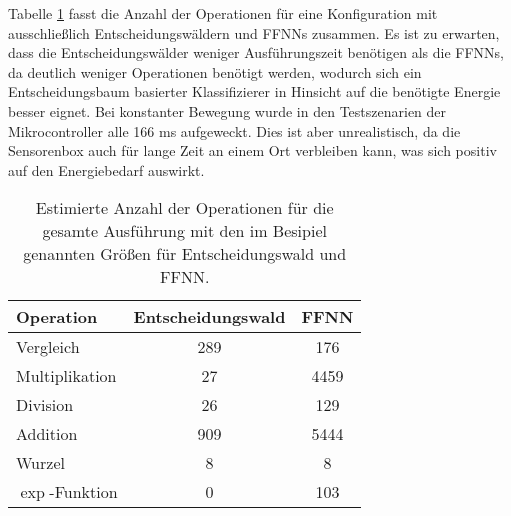 \newline
\newline
Tabelle \ref{tab:complexity_summary} fasst die Anzahl der Operationen für eine Konfiguration mit ausschließlich Entscheidungswäldern und FFNNs zusammen.
Es ist zu erwarten, dass die Entscheidungswälder weniger Ausführungszeit benötigen als die FFNNs, da deutlich weniger Operationen benötigt werden,
wodurch sich ein Entscheidungsbaum basierter Klassifizierer in Hinsicht auf die benötigte Energie besser eignet.
Bei konstanter Bewegung wurde in den Testszenarien der Mikrocontroller alle 166 ms aufgeweckt.
Dies ist aber unrealistisch, da die Sensorenbox auch für lange Zeit an einem Ort verbleiben kann, was sich positiv auf den Energiebedarf auswirkt.
\begin{table}[h!]
    \centering
    \begin{tabular}{ | l | c | c | }
        \hline
        Operation & Entscheidungswald & FFNN \\\hline
        Vergleich & 289 & 176 \\\hline
        Multiplikation & 27 & 4459 \\\hline
        Division & 26 & 129 \\\hline
        Addition & 909 & 5444 \\\hline
        Wurzel & 8 & 8 \\\hline
        $\exp$-Funktion & 0 & 103 \\\hline
    \end{tabular}
    \caption{Estimierte Anzahl der Operationen für die gesamte Ausführung mit den im Besipiel genannten Größen für Entscheidungswald und FFNN.}
    \label{tab:complexity_summary}
\end{table}